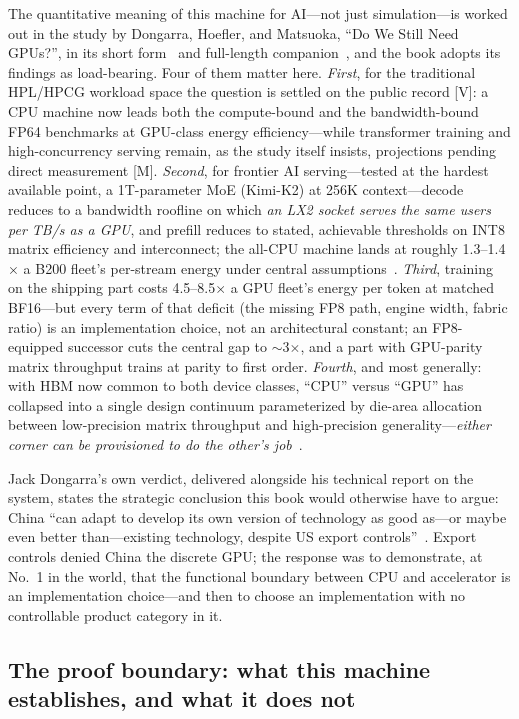 The quantitative meaning of this machine for AI---not just simulation---is worked out in the study by Dongarra, Hoefler, and Matsuoka, ``Do We Still Need GPUs?'', in its short form~\cite{dhm-cacm} and full-length companion~\cite{dhm-long}, and the book adopts its findings as load-bearing. Four of them matter here. \emph{First}, for the traditional HPL/HPCG workload space the question is settled on the public record [V]: a CPU machine now leads both the compute-bound and the bandwidth-bound FP64 benchmarks at GPU-class energy efficiency---while transformer training and high-concurrency serving remain, as the study itself insists, projections pending direct measurement [M]. \emph{Second}, for frontier AI serving---tested at the hardest available point, a 1T-parameter MoE (Kimi-K2) at 256K context---decode reduces to a bandwidth roofline on which \emph{an LX2 socket serves the same users per TB/s as a GPU}, and prefill reduces to stated, achievable thresholds on INT8 matrix efficiency and interconnect; the all-CPU machine lands at roughly 1.3--1.4$\times$ a B200 fleet's per-stream energy under central assumptions~\cite{dhm-long}. \emph{Third}, training on the shipping part costs 4.5--8.5$\times$ a GPU fleet's energy per token at matched BF16---but every term of that deficit (the missing FP8 path, engine width, fabric ratio) is an implementation choice, not an architectural constant; an FP8-equipped successor cuts the central gap to $\sim$3$\times$, and a part with GPU-parity matrix throughput trains at parity to first order. \emph{Fourth}, and most generally: with HBM now common to both device classes, ``CPU'' versus ``GPU'' has collapsed into a single design continuum parameterized by die-area allocation between low-precision matrix throughput and high-precision generality---\emph{either corner can be provisioned to do the other's job}~\cite{dhm-cacm,dhm-long}.

Jack Dongarra's own verdict, delivered alongside his technical report on the system, states the strategic conclusion this book would otherwise have to argue: China ``can adapt to develop its own version of technology as good as---or maybe even better than---existing technology, despite US export controls''~\cite{dongarra-scmp,dongarra-report}. Export controls denied China the discrete GPU; the response was to demonstrate, at No.~1 in the world, that the functional boundary between CPU and accelerator is an implementation choice---and then to choose an implementation with no controllable product category in it.

\subsection{The proof boundary: what this machine establishes, and what it does not}
\label{sec:proofboundary}

